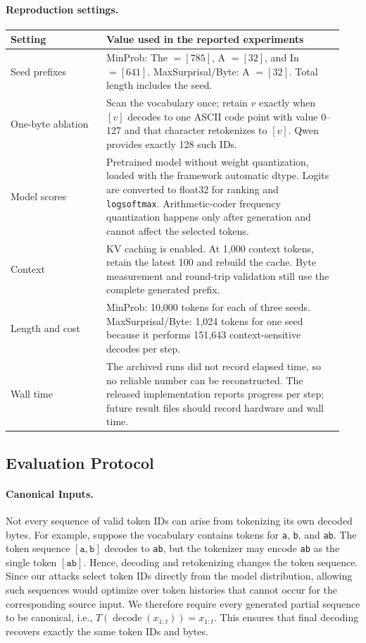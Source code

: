\paragraph{Reproduction settings.}
\begin{center}
\begin{tabular}{@{}p{0.27\linewidth}p{0.67\linewidth}@{}}
\toprule
\textbf{Setting} & \textbf{Value used in the reported experiments} \\
\midrule
Seed prefixes & MinProb: The $=[785]$, A $=[32]$, and In $=[641]$.
MaxSurprisal/Byte: A $=[32]$. Total length includes the seed. \\
One-byte ablation & Scan the vocabulary once; retain $v$ exactly when $[v]$
decodes to one ASCII code point with value 0--127 and that character retokenizes
to $[v]$. Qwen provides exactly 128 such IDs. \\
Model scores & Pretrained model without weight quantization, loaded with the
framework automatic dtype. Logits are converted to float32 for ranking and
\texttt{logsoftmax}. Arithmetic-coder frequency quantization happens only after
generation and cannot affect the selected tokens. \\
Context & KV caching is enabled. At 1,000 context tokens, retain the latest 100
and rebuild the cache. Byte measurement and round-trip validation still use the
complete generated prefix. \\
Length and cost & MinProb: 10,000 tokens for each of three seeds.
MaxSurprisal/Byte: 1,024 tokens for one seed because it performs 151,643
context-sensitive decodes per step. \\
Wall time & The archived runs did not record elapsed time, so no reliable number
can be reconstructed. The released implementation reports progress per step;
future result files should record hardware and wall time. \\
\bottomrule
\end{tabular}
\end{center}

\subsection{Evaluation Protocol}
\label{app:experimental-details}

\paragraph{Canonical Inputs.}
\label{app:canonicality}
Not every sequence of valid token IDs can arise from tokenizing its own decoded
bytes. For example, suppose the vocabulary contains tokens for
\texttt{a}, \texttt{b}, and \texttt{ab}. The token sequence
$[\texttt{a},\texttt{b}]$ decodes to \texttt{ab}, but the tokenizer may encode
\texttt{ab} as the single token $[\texttt{ab}]$. Hence, decoding and
retokenizing changes the token sequence. Since our attacks select token IDs
directly from the model distribution, allowing such sequences would optimize
over token histories that cannot occur for the corresponding source input.
We therefore require every generated partial sequence to be canonical, i.e.,
$T(\operatorname{decode}(x_{1:t}))=x_{1:t}$. This ensures that final decoding
recovers exactly the same token IDs and bytes.

